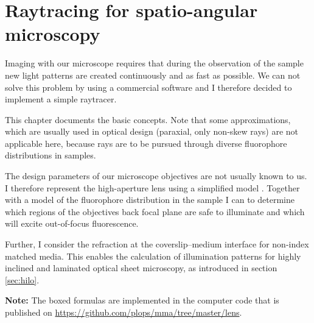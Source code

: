 \chapter{Raytracing for spatio-angular microscopy}
\label{sec:raytrace}
\renewcommand{\i}{\nvect i}
\begin{summary}
  Imaging with our microscope requires that during the observation of
  the sample new light patterns are created continuously and as fast
  as possible. We can not solve this problem by using a commercial
  software and I therefore decided to implement a simple raytracer.

  This chapter documents the basic concepts. Note that some
  approximations, which are usually used in optical design (paraxial,
  only non-skew rays) are not applicable here, because rays are to be
  pursued through diverse fluorophore distributions in samples.

  The design parameters of our microscope objectives are not usually
  known to us. I therefore represent the high-aperture lens using a
  simplified model \citep{Hwang2008}. Together with a model of the
  fluorophore distribution in the sample I can to determine which
  regions of the objectives back focal plane are safe to illuminate
  and which will excite out-of-focus fluorescence.

  Further, I consider the refraction at the coverslip--medium
  interface for non-index matched media. This enables the calculation
  of illumination patterns for highly inclined and laminated optical
  sheet microscopy, as introduced in section \ref{sec:hilo}.

  {\bf Note:} The boxed formulas are implemented in the computer code
  that is published on
  \url{https://github.com/plops/mma/tree/master/lens}.
\end{summary}
